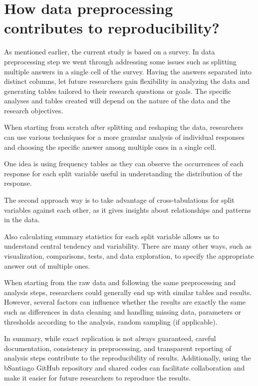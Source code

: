 \documentclass[
11pt, %
oneside, %
english, %
singlespacing, %
]{macthesis} %
\begin{document}
\hypertarget{how-data-preprocessing-contributes-to-reproducibility}{%
\section{How data preprocessing contributes to reproducibility?}\label{how-data-preprocessing-contributes-to-reproducibility}}

As mentioned earlier, the current study is based on a survey. In data preprocessing step we went through addressing some issues such as splitting multiple answers in a single cell of the survey. Having the answers separated into distinct columns, let future researchers gain flexibility in analyzing the data and generating tables tailored to their research questions or goals. The specific analyses and tables created will depend on the nature of the data and the research objectives.

When starting from scratch after splitting and reshaping the data, researchers can use various techniques for a more granular analysis of individual responses and choosing the specific answer among multiple ones in a single cell.

One idea is using frequency tables as they can observe the occurrences of each response for each split variable useful in understanding the distribution of the response.

The second approach way is to take advantage of cross-tabulations for split variables against each other, as it gives insights about relationships and patterns in the data.

Also calculating summary statistics for each split variable allows us to understand central tendency and variability. There are many other ways, such as visualization, comparisons, tests, and data exploration, to specify the appropriate answer out of multiple ones.

When starting from the raw data and following the same preprocessing and analysis steps, researchers could generally end up with similar tables and results. However, several factors can influence whether the results are exactly the same such as differences in data cleaning and handling missing data, parameters or thresholds according to the analysis, random sampling (if applicable).

In summary, while exact replication is not always guaranteed, careful documentation, consistency in preprocessing, and transparent reporting of analysis steps contribute to the reproducibility of results. Additionally, using the bSantiago GitHub repository and shared codes can facilitate collaboration and make it easier for future researchers to reproduce the results.
\end{document}
